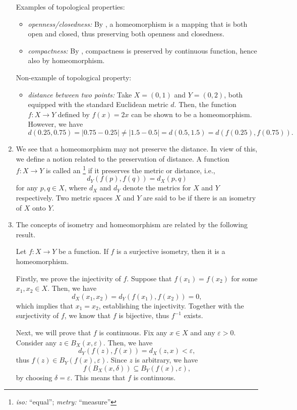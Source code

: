 \begin{enumerate}
Examples of topological properties:
\begin{itemize}
\item \emph{openness/closedness:} By , a homeomorphism is a
mapping that is both open and closed, thus preserving both openness and
closedness.
\item \emph{compactness:} By , compactness is
preserved by continuous function, hence also by homeomorphism.
\end{itemize}
Non-example of topological property:
\begin{itemize}
\item \emph{distance between two points:} Take \(X=(0,1)\) and \(Y=(0,2)\),
both equipped with the standard Euclidean metric \(d\). Then, the function
\(f:X\to Y\) defined by \(f(x)=2x\) can be shown to be a homeomorphism.
However, we have
\[
d(0.25,0.75)=|0.75-0.25|\ne |1.5-0.5|=d(0.5,1.5)=d(f(0.25),f(0.75)).
\]
\end{itemize}
\item We see that a homeomorphism may not preserve the distance. In view of
this, we define a notion related to the preservation of distance. A function
\(f:X\to Y\) is called an \footnote{\emph{iso:} ``equal'';
\emph{metry:} ``measure''} if it preserves the metric or distance, i.e.,
\[
d_Y(f(p),f(q))=d_X(p,q)
\]
for any \(p,q\in X\), where \(d_X\) and \(d_Y\) denote the metrics for \(X\)
and \(Y\) respectively. Two metric spaces \(X\) and \(Y\) are said to be
 if there is an isometry of \(X\) onto \(Y\).

\item The concepts of isometry and homeomorphism are related by the following
result.
\begin{proposition}
\label{prp:surj-iso-hmph}
Let \(f:X\to Y\) be a function. If \(f\) is a surjective isometry, then it is a
homeomorphism.
\end{proposition}
\begin{pf}
Firstly, we prove the injectivity of \(f\). Suppose that
\(f(x_1)=f(x_2)\) for some \(x_1,x_2\in X\). Then, we have
\[
d_X(x_1,x_2)=d_Y(f(x_1),f(x_2))=0,
\]
which implies that \(x_1=x_2\), establishing the injectivity. Together with the
surjectivity of \(f\), we know that \(f\) is bijective, thus \(f^{-1}\) exists.

Next, we will prove that \(f\) is continuous. Fix any \(x\in X\) and any
\(\varepsilon>0\). Consider any \(z\in B_X(x,\varepsilon)\). Then, we have
\[
d_Y(f(z),f(x))=d_X(z,x)<\varepsilon,
\]
thus \(f(z)\in B_{Y}(f(x),\varepsilon)\). Since \(z\) is arbitrary, we have
\[
f(B_X(x,\delta))\subseteq B_Y(f(x),\varepsilon),
\]
by choosing \(\delta=\varepsilon\).  This means that \(f\) is continuous.


\end{pf}
\end{enumerate}
